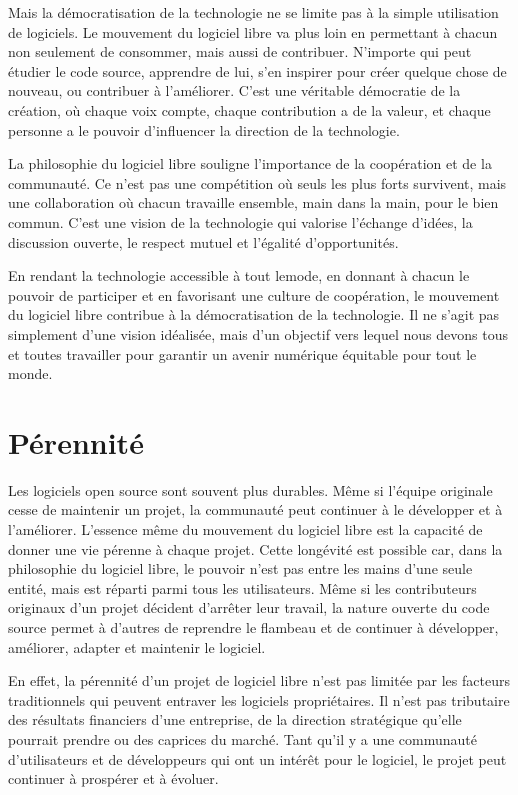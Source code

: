 Mais la démocratisation de la technologie ne se limite pas à la simple utilisation de logiciels. Le mouvement du logiciel libre va plus loin en permettant à chacun non seulement de consommer, mais aussi de contribuer. N'importe qui peut étudier le code source, apprendre de lui, s'en inspirer pour créer quelque chose de nouveau, ou contribuer à l'améliorer. C'est une véritable démocratie de la création, où chaque voix compte, chaque contribution a de la valeur, et chaque personne a le pouvoir d'influencer la direction de la technologie.

La philosophie du logiciel libre souligne l'importance de la coopération et de la communauté. Ce n'est pas une compétition où seuls les plus forts survivent, mais une collaboration où chacun travaille ensemble, main dans la main, pour le bien commun. C'est une vision de la technologie qui valorise l'échange d'idées, la discussion ouverte, le respect mutuel et l'égalité d'opportunités.

En rendant la technologie accessible à tout lemode, en donnant à chacun le pouvoir de participer et en favorisant une culture de coopération, le mouvement du logiciel libre contribue à la démocratisation de la technologie. Il ne s'agit pas simplement d'une vision idéalisée, mais d'un objectif vers lequel nous devons tous et toutes travailler pour garantir un avenir numérique équitable pour tout le monde.


\section{Pérennité} 
Les logiciels open source sont souvent plus durables. Même si l'équipe originale cesse de maintenir un projet, la communauté peut continuer à le développer et à l'améliorer.
L'essence même du mouvement du logiciel libre est la capacité de donner une vie pérenne à chaque projet. Cette longévité est possible car, dans la philosophie du logiciel libre, le pouvoir n'est pas entre les mains d'une seule entité, mais est réparti parmi tous les utilisateurs. Même si les contributeurs originaux d'un projet décident d'arrêter leur travail, la nature ouverte du code source permet à d'autres de reprendre le flambeau et de continuer à développer, améliorer, adapter et maintenir le logiciel.

En effet, la pérennité d'un projet de logiciel libre n'est pas limitée par les facteurs traditionnels qui peuvent entraver les logiciels propriétaires. Il n'est pas tributaire des résultats financiers d'une entreprise, de la direction stratégique qu'elle pourrait prendre ou des caprices du marché. Tant qu'il y a une communauté d'utilisateurs et de développeurs qui ont un intérêt pour le logiciel, le projet peut continuer à prospérer et à évoluer.

